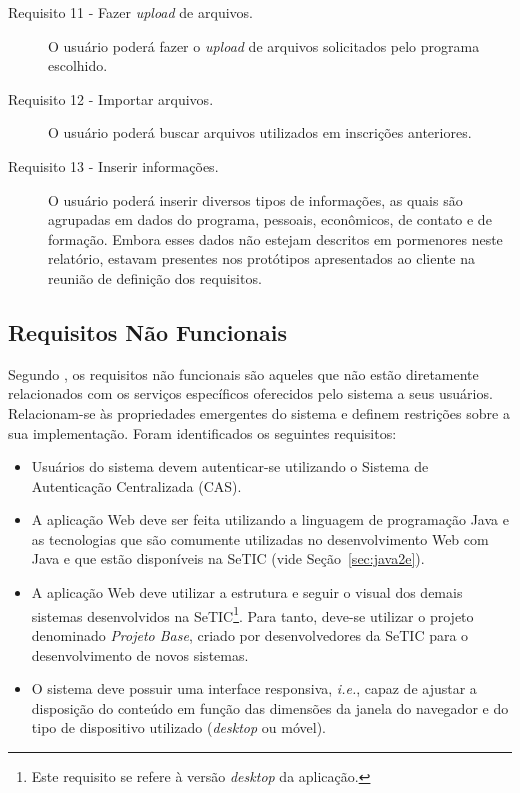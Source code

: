 \documentclass[
  10.5pt,				  %
	openright,			%
	twoside,			  %
  a5paper,
  chapter=TITLE,	%
	section=TITLE,	%
  hyphens,        %
	english,        %
	brazil          %
]{abntex2}
\begin{document}
\begin{description}
\item[Requisito 11 - Fazer \emph{upload} de arquivos.] O usuário poderá fazer o \emph{upload} de arquivos solicitados pelo programa escolhido.
\item[Requisito 12 - Importar arquivos.] O usuário poderá buscar arquivos utilizados em inscrições anteriores.
\item[Requisito 13 - Inserir informações.] O usuário poderá inserir diversos tipos de informações, as quais são agrupadas em dados do programa, pessoais, econômicos, de contato e de formação. Embora esses dados não estejam descritos em pormenores neste relatório, estavam presentes nos protótipos apresentados ao cliente na reunião de definição dos requisitos.
\end{description}


\subsection{Requisitos Não Funcionais}

Segundo , os requisitos não funcionais são aqueles que não estão diretamente relacionados com os serviços específicos oferecidos pelo sistema a seus usuários. Relacionam-se às propriedades emergentes do sistema e definem restrições sobre a sua implementação. Foram identificados os seguintes requisitos:

\begin{itemize}
\item Usuários do sistema devem autenticar-se utilizando o Sistema de Autenticação Centralizada (CAS).
\item A aplicação Web deve ser feita utilizando a linguagem de programação Java e as tecnologias que são comumente utilizadas no desenvolvimento Web com Java e que estão disponíveis na SeTIC (vide Seção~\ref{sec:java2e}).
\item A aplicação Web deve utilizar a estrutura e seguir o visual dos demais sistemas desenvolvidos na SeTIC\footnote{Este requisito se refere à versão \emph{desktop} da aplicação.}. Para tanto, deve-se utilizar o projeto denominado \emph{Projeto Base}, criado por desenvolvedores da SeTIC para o desenvolvimento de novos sistemas.
\item O sistema deve possuir uma interface responsiva, \emph{i.e.}, capaz de ajustar a disposição do conteúdo em função das dimensões da janela do navegador e do tipo de dispositivo utilizado (\emph{desktop} ou móvel). 
\end{itemize}
\end{document}
